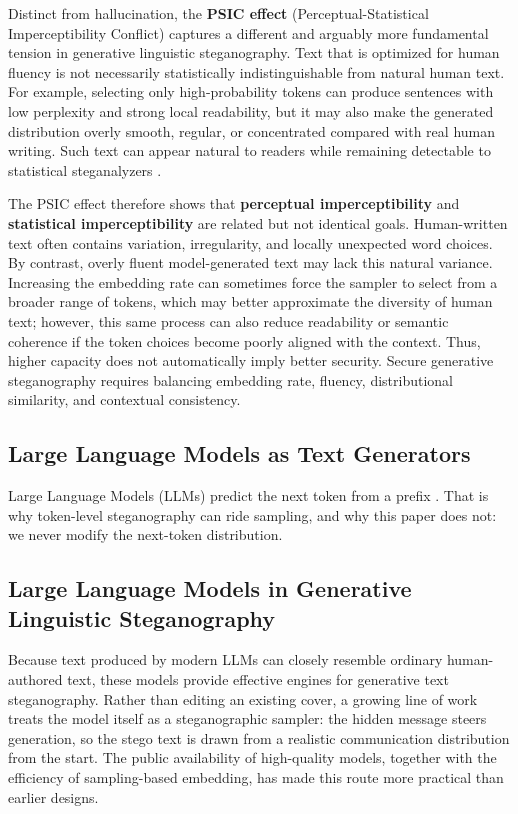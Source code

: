 Distinct from hallucination, the \textbf{PSIC effect} (Perceptual-Statistical Imperceptibility Conflict) \cite{yang2020vae} captures a different and arguably more fundamental tension in generative linguistic steganography. Text that is optimized for human fluency is not necessarily statistically indistinguishable from natural human text. For example, selecting only high-probability tokens can produce sentences with low perplexity and strong local readability, but it may also make the generated distribution overly smooth, regular, or concentrated compared with real human writing. Such text can appear natural to readers while remaining detectable to statistical steganalyzers \cite{yang2020vae}.

The PSIC effect therefore shows that \textbf{perceptual imperceptibility} and \textbf{statistical imperceptibility} are related but not identical goals. Human-written text often contains variation, irregularity, and locally unexpected word choices. By contrast, overly fluent model-generated text may lack this natural variance. Increasing the embedding rate can sometimes force the sampler to select from a broader range of tokens, which may better approximate the diversity of human text; however, this same process can also reduce readability or semantic coherence if the token choices become poorly aligned with the context. Thus, higher capacity does not automatically imply better security. Secure generative steganography requires balancing embedding rate, fluency, distributional similarity, and contextual consistency.

\subsection{Large Language Models as Text Generators}
\label{sec:background-llm-generators}

Large Language Models (LLMs) predict the next token from a prefix \cite{vaswani2017attention,kaptchuk2021meteor,radford2019language}.
That is why token-level steganography can ride sampling, and why this paper does not: we never modify the next-token distribution.

\subsection{Large Language Models in Generative Linguistic Steganography}
\label{sec:background-llm-stego}

Because text produced by modern LLMs can closely resemble ordinary human-authored text, these models provide effective engines for generative text steganography. Rather than editing an existing cover, a growing line of work treats the model itself as a steganographic sampler: the hidden message steers generation, so the stego text is drawn from a realistic communication distribution from the start. The public availability of high-quality models, together with the efficiency of sampling-based embedding, has made this route more practical than earlier designs.

